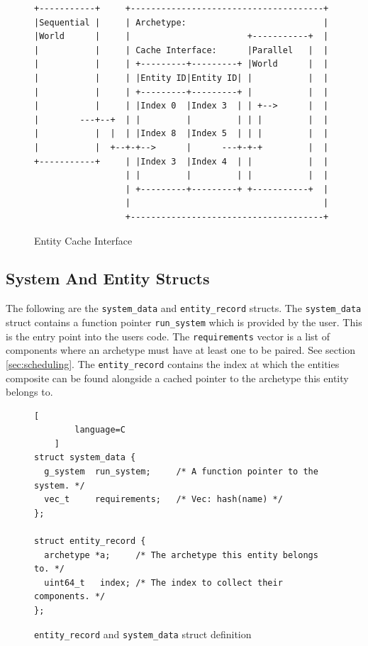 \begin{figure}[H]
\begin{verbatim}
+-----------+     +--------------------------------------+               
|Sequential |     | Archetype:                           |               
|World      |     |                       +-----------+  |               
|           |     | Cache Interface:      |Parallel   |  |               
|           |     | +---------+---------+ |World      |  |               
|           |     | |Entity ID|Entity ID| |           |  |               
|           |     | +---------+---------+ |           |  |               
|           |     | |Index 0  |Index 3  | | +-->      |  |               
|        ---+--+  | |         |         | | |         |  |               
|           |  |  | |Index 8  |Index 5  | | |         |  |               
|           |  +--+-+-->      |      ---+-+-+         |  |               
+-----------+     | |Index 3  |Index 4  | |           |  |               
                  | |         |         | |           |  |               
                  | +---------+---------+ +-----------+  |               
                  |                                      |               
                  +--------------------------------------+                               
\end{verbatim}
\caption{Entity Cache Interface}
\label{code:component_retrieval}
\end{figure}

\subsection{System And Entity Structs}
The following are the \texttt{system\_data} and \texttt{entity\_record} structs. The \texttt{system\_data} struct contains a function pointer \texttt{run\_system} which is provided by the user. This is the entry point into the users code. The \texttt{requirements} vector is a list of components where an archetype must have at least one to be paired. See section \ref{sec:scheduling}. The \texttt{entity\_record} contains the index at which the entities composite can be found alongside a cached pointer to the archetype this entity belongs to.

\begin{figure}[htbp]
    \begin{lstlisting}[
        language=C
    ]
struct system_data {
  g_system  run_system;     /* A function pointer to the system. */
  vec_t     requirements;   /* Vec: hash(name) */
};

struct entity_record {
  archetype *a;     /* The archetype this entity belongs to. */
  uint64_t   index; /* The index to collect their components. */
};
    \end{lstlisting}
    \caption{\texttt{entity\_record} and \texttt{system\_data} struct definition}
    \label{code:sd_and_er}
\end{figure}

